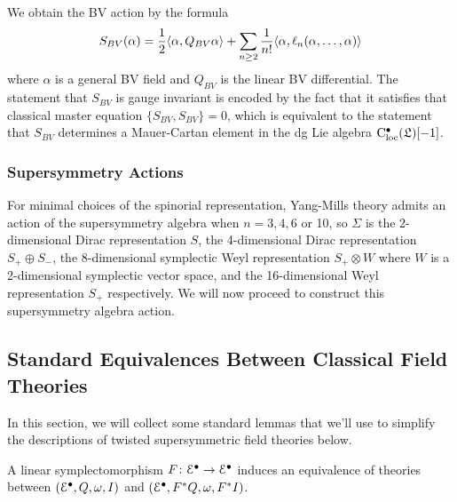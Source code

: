 \documentclass[10pt, oneside]{article}
\begin{document}
We obtain the BV action by the formula
\[
S_{BV} (\alpha) = \frac{1}{2} \langle\alpha , Q_{BV} \alpha\rangle + \sum_{n \geq 2} \frac{1}{n!} \langle\alpha, \ell_n(\alpha,\ldots, \alpha)\rangle 
\]
where $\alpha$ is a general BV field and $Q_{BV}$ is the linear BV differential. 
The statement that $S_{BV}$ is gauge invariant is encoded by the fact that it satisfies that classical master equation $\{S_{BV}, S_{BV}\} = 0$, which is equivalent to the statement that $S_{BV}$ determines a Mauer-Cartan element in the dg Lie algebra ${\rm C}_{\rm loc}^\bullet(\mathfrak L)[-1]$.

\subsubsection{Supersymmetry Actions} \label{SUSY_action_section}
For minimal choices of the spinorial representation, Yang-Mills theory admits an action of the supersymmetry algebra when $n=3,4,6$ or 10, so $\Sigma$ is the 2-dimensional Dirac representation $S$, the 4-dimensional Dirac representation $S_+ \oplus S_-$, the 8-dimensional symplectic Weyl representation $S_+ \otimes W$ where $W$ is a 2-dimensional symplectic vector space, and the 16-dimensional Weyl representation $S_+$ respectively.  We will now proceed to construct this supersymmetry algebra action. 

\subsection{Standard Equivalences Between Classical Field Theories}
In this section, we will collect some standard lemmas that we'll use to simplify the descriptions of twisted supersymmetric field theories below.

\begin{lemma} \label{symplectomorphism_lemma}
A linear symplectomorphism $F \colon \mathcal{E}^\bullet \to \mathcal{E}^\bullet$ induces an equivalence of theories between $(\mathcal{E}^\bullet, Q, \omega, I)$ and $(\mathcal{E}^\bullet, F^*Q, \omega, F^*I)$.
\end{lemma}

 
\end{document}
